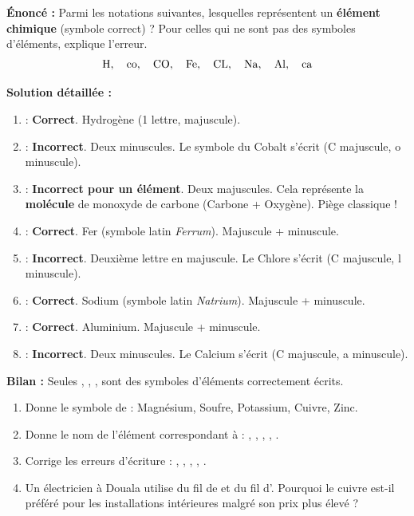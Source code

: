 \documentclass[11pt]{article}
\begin{document}
\begin{exoresolu}
\textbf{Énoncé :} Parmi les notations suivantes, lesquelles représentent un \textbf{élément chimique} (symbole correct) ? Pour celles qui ne sont pas des symboles d'éléments, explique l'erreur.
\[
\ce{H}, \quad \ce{co}, \quad \ce{CO}, \quad \ce{Fe}, \quad \ce{CL}, \quad \ce{Na}, \quad \ce{Al}, \quad \ce{ca}
\]

\tcblower
\textbf{Solution détaillée :}

\begin{enumerate}
    \item {} : \textbf{Correct}. Hydrogène (1 lettre, majuscule).
    \item {} : \textbf{Incorrect}. Deux minuscules. Le symbole du Cobalt s'écrit  (C majuscule, o minuscule).
    \item {} : \textbf{Incorrect pour un élément}. Deux majuscules. Cela représente la \textbf{molécule} de monoxyde de carbone (Carbone + Oxygène). Piège classique !
    \item {} : \textbf{Correct}. Fer (symbole latin \emph{Ferrum}). Majuscule + minuscule.
    \item {} : \textbf{Incorrect}. Deuxième lettre en majuscule. Le Chlore s'écrit  (C majuscule, l minuscule).
    \item {} : \textbf{Correct}. Sodium (symbole latin \emph{Natrium}). Majuscule + minuscule.
    \item {} : \textbf{Correct}. Aluminium. Majuscule + minuscule.
    \item {} : \textbf{Incorrect}. Deux minuscules. Le Calcium s'écrit  (C majuscule, a minuscule).
\end{enumerate}

\textbf{Bilan :} Seules , , ,  sont des symboles d'éléments correctement écrits.
\end{exoresolu}

\begin{exercice}
\begin{enumerate}
    \item Donne le symbole de : Magnésium, Soufre, Potassium, Cuivre, Zinc.
    \item Donne le nom de l'élément correspondant à : , , , , .
    \item Corrige les erreurs d'écriture : , , , , .
    \item Un électricien à Douala utilise du fil de  et du fil d'. Pourquoi le cuivre est-il préféré pour les installations intérieures malgré son prix plus élevé ?
\end{enumerate}
\end{exercice}
\end{document}
